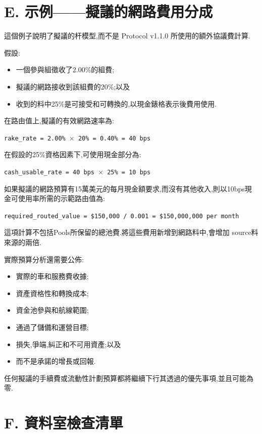 \documentclass[11pt]{article}
\begin{document}
\section*{E. 示例------擬議的網路費用分成}

這個例子說明了擬議的杆模型,而不是 Protocol v1.1.0 所使用的額外協議費計算.

假設:

\begin{itemize}[leftmargin=*]
\item 一個參與組徵收了2.00\%的組費;
\item 擬議的網路接收到該組費的20\%;以及
\item 收到的料中25\%是可接受和可轉換的,以現金錶格表示後費用使用.
\end{itemize}
在路由值上,擬議的有效網路速率為:

\texttt{rake\_rate = 2.00\% $\times$ 20\% = 0.40\% = 40 bps}

在假設的25\%資格因素下,可使用現金部分為:

\texttt{cash\_usable\_rate = 40 bps $\times$ 25\% = 10 bps}

如果擬議的網路預算有15萬美元的每月現金額要求,而沒有其他收入,則以10bps現金可使用率所需的示範路由值為:

\texttt{required\_routed\_value = \$150,000 / 0.001 = \$150,000,000 per month}

這項計算不包括Pools所保留的總池費.將這些費用新增到網路料中,會增加 source料來源的兩倍.

實際預算分析還需要公佈:

\begin{itemize}[leftmargin=*]
\item 實際的車和服務費收據;
\item 資產資格性和轉換成本;
\item 資金池參與和航線範圍;
\item 通過了儲備和運營目標;
\item 損失,爭端,糾正和不可用資產;以及
\item 而不是承諾的增長或回報.
\end{itemize}
任何擬議的手續費或流動性計劃預算都將繼續下行其透過的優先事項,並且可能為零.


\section*{F. 資料室檢查清單}
\end{document}
